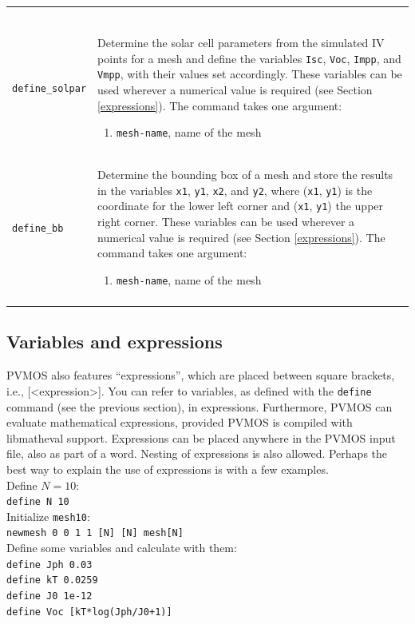 \documentclass[noshowpacs,preprintnumbers,amsmath,amssymb, letter]{revtex4}
\begin{document}
\begin{longtable}{p{}p{}}
\begin{enumerate}
\end{enumerate}\\
\texttt{define\_solpar}	&  Determine the solar cell parameters from the simulated IV points for a mesh and define the variables \texttt{Isc}, \texttt{Voc}, \texttt{Impp}, and \texttt{Vmpp}, with their values set accordingly. These variables can be used wherever a numerical value is required (see Section \ref{expressions}). The command takes one argument:
\begin{enumerate}
\item \texttt{mesh-name}, name of the mesh
\end{enumerate}\\
\texttt{define\_bb}	&  Determine the bounding box of a mesh and store the results in the variables \texttt{x1}, \texttt{y1}, \texttt{x2}, and \texttt{y2}, where (\texttt{x1}, \texttt{y1}) is the coordinate for the lower left corner and (\texttt{x1}, \texttt{y1}) the upper right corner. These variables can be used wherever a numerical value is required (see Section \ref{expressions}). The command takes one argument:
\begin{enumerate}
\item \texttt{mesh-name}, name of the mesh
\end{enumerate}\\
\hline
\\
\end{longtable}
\subsection{\label{expressions}Variables and expressions}
PVMOS also features ``expressions'', which are placed between square brackets, i.e., [\textless expression\textgreater]. You can refer to variables, as defined with the \texttt{define} command (see the previous section), in expressions. Furthermore, PVMOS can evaluate mathematical expressions, provided PVMOS is compiled with libmatheval support. Expressions can be placed anywhere in the PVMOS input file, also as part of a word. Nesting of expressions is also allowed. Perhaps the best way to explain the use of expressions is with a few examples.\\
Define $N=10$:\\
\texttt{define N 10} \\
Initialize \texttt{mesh10}:\\
\texttt{newmesh 0 0 1 1 [N] [N] mesh[N]}\\
Define some variables and calculate with them:\\
\texttt{define Jph 0.03} \\
\texttt{define kT 0.0259} \\
\texttt{define J0 1e-12} \\
\texttt{define Voc [kT*log(Jph/J0+1)]} \\
\end{document}
